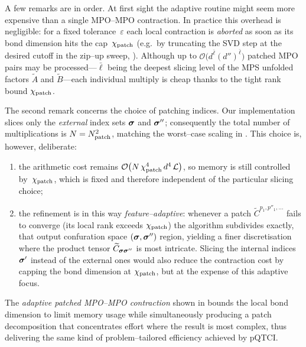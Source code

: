 A few remarks are in order. At first sight the adaptive routine might seem more expensive than a single MPO--MPO contraction.  In practice this overhead is negligible: for a fixed tolerance~$\varepsilon$ each local contraction is \emph{aborted} as soon as its bond dimension hits the cap~$\chi_{\text{patch}}$ (e.g.\ by truncating 
the SVD step at the desired cutoff in the zip--up sweep, ). Although up to
\(\mathcal{O} \bigl(d^{\bar\ell}(d'')^{\bar\ell}\bigr)\) patched MPO pairs may be
processed---\(\bar\ell\) being the deepest slicing level of the MPS unfolded factors $\widetilde{A}$ and $\widetilde{B}$---each individual multiply is cheap thanks to the tight rank bound $\chi_{\text{patch}}$.

The second remark concerns the choice of patching indices. Our implementation slices only the \emph{external} index sets \(\boldsymbol{\sigma}\) and \(\boldsymbol{\sigma}''\); consequently the total number of multiplications is \(N=N_{\text{patch}}^{2}\), matching the worst--case scaling in .  This choice is,
however, deliberate:  
\begingroup
\renewcommand{\labelenumi}{(\alph{enumi})}
\begin{enumerate}
  \item the arithmetic cost remains
        \(\mathcal{O} \bigl(N\,\chi_{\text{patch}}^{4}\,d^{4}\,\mathcal{L} \bigr)\), so memory is still controlled by~\(\chi_{\text{patch}}\), which is fixed and therefore independent of the particular slicing choice;
  \item the refinement is in this way \emph{feature--adaptive}: whenever a patch  \(\widetilde{C}^{p_1,p''_1,\dots}\) fails to converge (its local rank exceeds \(\chi_{\text{patch}}\)) the algorithm subdivides exactly, that output confuration space $(\boldsymbol{\sigma}, \boldsymbol{\sigma}'')$ region, yielding a finer discretisation where the product tensor \(\widetilde{C}_{\boldsymbol{\sigma} \boldsymbol{\sigma}''}\) is most intricate. Slicing the internal indices \(\boldsymbol{\sigma}'\) instead of the external ones would also reduce the contraction cost by capping the bond dimension at $\chi_{\text{patch}}$, but at the expense of this adaptive focus.
\end{enumerate}
\endgroup

The \emph{adaptive patched MPO--MPO contraction} shown in  bounds the local bond dimension to limit memory usage while simultaneously producing a patch decomposition that concentrates effort where the result is most complex, thus delivering the same kind of problem--tailored efficiency achieved by pQTCI.



